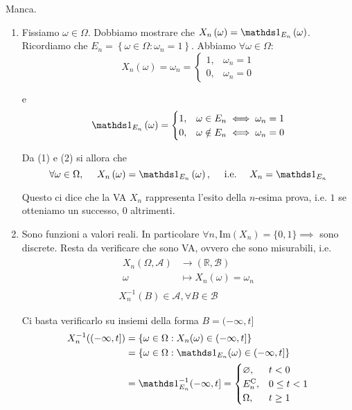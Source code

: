 Manca.
\Soluzione
\begin{enumerate}
\item Fissiamo $\omega \in \Omega $. Dobbiamo mostrare che $X_{n}\left( \omega \right) =\Ind_{E_{n}}\left( \omega \right)$. Ricordiamo che $E_{n} =\left\{\omega \in \Omega :\omega _{n} =1\right\}$. Abbiamo $\forall \omega \in \Omega $:\begin{equation}
X_{n}\left( \omega \right) =\omega _{n} =\begin{cases}
1, & \omega _{n} =1\\
0, & \omega _{n} =0
\end{cases}
\end{equation}

e\begin{equation}
\Ind_{E_{n}}\left( \omega \right) =\begin{cases}
1, & \omega \in E_{n} \iff \omega _{n} =1\\
0, & \omega \notin E_{n} \iff \omega _{n} =0
\end{cases}
\end{equation}

Da (1) e (2) si allora che\begin{equation*}
\forall \omega \in \Omega ,\ \ \ \ X_{n}\left( \omega \right) =\Ind_{E_{n}}\left( \omega \right) ,\ \ \ \ \text{i.e.} \ \ \ \ X_{n} =\Ind_{E_{n}}
\end{equation*}

\begin{oss}
Questo ci dice che la VA $X_{n}$ rappresenta l'esito della $n$-esima prova, i.e. $1$ se otteniamo un successo, $0$ altrimenti.
\end{oss}
\item Sono funzioni a valori reali. In particolare $\forall n,\mathrm{Im}( X_{n}) =\{0,1\} \implies $ sono discrete. Resta da verificare che sono VA, ovvero che sono misurabili, i.e.\begin{gather*}
\begin{aligned}
X_{n}( \Omega ,\mathcal{A}) & \rightarrow (\mathbb{R} ,\mathcal{B})\\
\omega  & \mapsto X_{n}( \omega ) =\omega _{n}
\end{aligned}\\
X_{n}^{-1}( B) \in \mathcal{A} ,\forall B\in \mathcal{B}
\end{gather*}

Ci basta verificarlo su insiemi della forma $B=( -\infty ,t]$\begin{equation*}
\begin{aligned}
X_{n}^{-1}(( -\infty ,t]) & =\{\omega \in \Omega :X_{n}( \omega ) \in ( -\infty ,t]\}\\
 & =\{\omega \in \Omega :\Ind_{E_{n}}( \omega ) \in ( -\infty ,t]\}\\
 & =\Ind_{E_{n}}^{-1}( -\infty ,t] =\begin{cases}
\emptyset , & t< 0\\
E_{n}\comp , & 0\leq t< 1\\
\Omega , & t\geq 1
\end{cases}
\end{aligned}
\end{equation*}


\end{enumerate}
